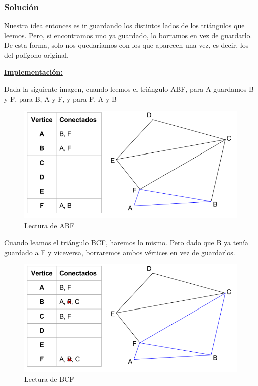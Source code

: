 \subsubsection{Solución}
Nuestra idea entonces es ir guardando los distintos lados de los triángulos que leemos. Pero, si encontramos uno ya guardado, lo borramos en vez de guardarlo. De esta forma, solo nos quedaríamos con los que aparecen una vez, es decir, los del polígono original.

\underline{\textbf{Implementación:}}

Dada la siguiente imagen, cuando leemos el triángulo ABF, para A guardamos B y F, para B, A y F, y para F, A y B

\begin{figure}[H]\centering\includegraphics[scale=0.7]{Imagenes/ej1/Imagen_D.png}\caption{Lectura de ABF}\end{figure}

Cuando leamos el triángulo BCF, haremos lo mismo. Pero dado que B ya tenía guardado a F y viceversa, borraremos ambos vértices en vez de guardarlos.

\begin{figure}[H]\centering\includegraphics[scale=0.7]{Imagenes/ej1/Imagen_E.png}\caption{Lectura de BCF}\end{figure}

